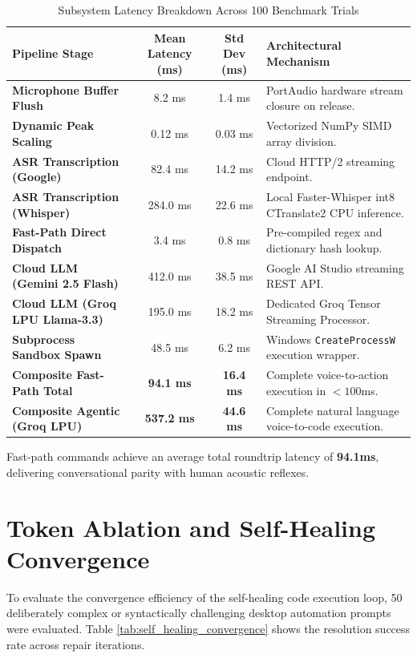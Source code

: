 \begin{table}[htbp]
\centering
\small
\caption{Subsystem Latency Breakdown Across 100 Benchmark Trials}
\label{tab:latency_benchmarks}
\begin{tabularx}{\textwidth}{|p{4.4cm}|c|c|X|}
\hline
\textbf{Pipeline Stage} & \textbf{Mean Latency (ms)} & \textbf{Std Dev (ms)} & \textbf{Architectural Mechanism} \\ \hline
\textbf{Microphone Buffer Flush} & 8.2 ms & 1.4 ms & PortAudio hardware stream closure on release. \\ \hline
\textbf{Dynamic Peak Scaling} & 0.12 ms & 0.03 ms & Vectorized NumPy SIMD array division. \\ \hline
\textbf{ASR Transcription (Google)} & 82.4 ms & 14.2 ms & Cloud HTTP/2 streaming endpoint. \\ \hline
\textbf{ASR Transcription (Whisper)} & 284.0 ms & 22.6 ms & Local Faster-Whisper int8 CTranslate2 CPU inference. \\ \hline
\textbf{Fast-Path Direct Dispatch} & 3.4 ms & 0.8 ms & Pre-compiled regex and dictionary hash lookup. \\ \hline
\textbf{Cloud LLM (Gemini 2.5 Flash)} & 412.0 ms & 38.5 ms & Google AI Studio streaming REST API. \\ \hline
\textbf{Cloud LLM (Groq LPU Llama-3.3)} & 195.0 ms & 18.2 ms & Dedicated Groq Tensor Streaming Processor. \\ \hline
\textbf{Subprocess Sandbox Spawn} & 48.5 ms & 6.2 ms & Windows \texttt{CreateProcessW} execution wrapper. \\ \hline
\textbf{Composite Fast-Path Total} & \textbf{94.1 ms} & \textbf{16.4 ms} & Complete voice-to-action execution in $<100$ms. \\ \hline
\textbf{Composite Agentic (Groq LPU)} & \textbf{537.2 ms} & \textbf{44.6 ms} & Complete natural language voice-to-code execution. \\ \hline
\end{tabularx}
\end{table}

Fast-path commands achieve an average total roundtrip latency of \textbf{94.1ms}, delivering conversational parity with human acoustic reflexes.

\section{Token Ablation and Self-Healing Convergence}
To evaluate the convergence efficiency of the self-healing code execution loop, 50 deliberately complex or syntactically challenging desktop automation prompts were evaluated. Table \ref{tab:self_healing_convergence} shows the resolution success rate across repair iterations.

